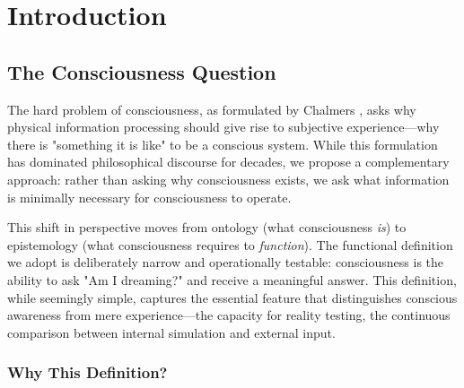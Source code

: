\documentclass[11pt,a4paper]{article}
\begin{document}
\begin{abstract}
The implications extend beyond sleep research to fundamental questions about consciousness: what information is minimally necessary to distinguish self from world, internal from external, simulation from reality? We demonstrate that this minimum is non-zero and must originate externally, establishing an information-theoretic lower bound on conscious awareness that cannot be circumvented through purely internal operations.

\textbf{Keywords:} consciousness, dreaming, lucid dreaming, biological Maxwell demons, information theory, reality testing, external input necessity, categorical equivalence, dream-reality continuum
\end{abstract}

\clearpage
\tableofcontents
\clearpage

\section{Introduction}

\subsection{The Consciousness Question}

The hard problem of consciousness, as formulated by Chalmers \cite{chalmers1996conscious}, asks why physical information processing should give rise to subjective experience—why there is "something it is like" to be a conscious system. While this formulation has dominated philosophical discourse for decades, we propose a complementary approach: rather than asking why consciousness exists, we ask what information is minimally necessary for consciousness to operate.

This shift in perspective moves from ontology (what consciousness \textit{is}) to epistemology (what consciousness requires to \textit{function}). The functional definition we adopt is deliberately narrow and operationally testable: consciousness is the ability to ask "Am I dreaming?" and receive a meaningful answer. This definition, while seemingly simple, captures the essential feature that distinguishes conscious awareness from mere experience—the capacity for reality testing, the continuous comparison between internal simulation and external input.

\subsubsection{Why This Definition?}
\end{document}
